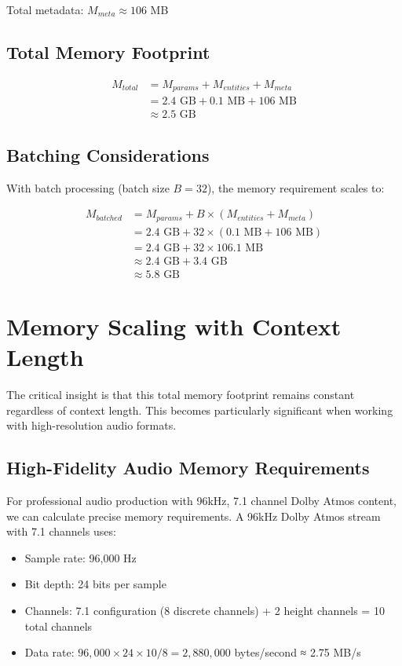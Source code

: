 Total metadata: $M_{meta} \approx 106$ MB

\subsection{Total Memory Footprint}

\begin{align}
M_{total} &= M_{params} + M_{entities} + M_{meta} \\
&= 2.4 \text{ GB} + 0.1 \text{ MB} + 106 \text{ MB} \\
&\approx 2.5 \text{ GB}
\end{align}

\subsection{Batching Considerations}

With batch processing (batch size $B = 32$), the memory requirement scales to:

\begin{align}
M_{batched} &= M_{params} + B \times (M_{entities} + M_{meta}) \\
&= 2.4 \text{ GB} + 32 \times (0.1 \text{ MB} + 106 \text{ MB}) \\
&= 2.4 \text{ GB} + 32 \times 106.1 \text{ MB} \\
&\approx 2.4 \text{ GB} + 3.4 \text{ GB} \\
&\approx 5.8 \text{ GB}
\end{align}

\section{Memory Scaling with Context Length}

The critical insight is that this total memory footprint remains constant regardless of context length. This becomes particularly significant when working with high-resolution audio formats.

\subsection{High-Fidelity Audio Memory Requirements}

For professional audio production with 96kHz, 7.1 channel Dolby Atmos content, we can calculate precise memory requirements. A 96kHz Dolby Atmos stream with 7.1 channels uses:

\begin{itemize}
    \item Sample rate: 96,000 Hz
    \item Bit depth: 24 bits per sample
    \item Channels: 7.1 configuration (8 discrete channels) + 2 height channels = 10 total channels
    \item Data rate: $96,000 \times 24 \times 10 / 8 = 2,880,000$ bytes/second ≈ 2.75 MB/s
\end{itemize}


